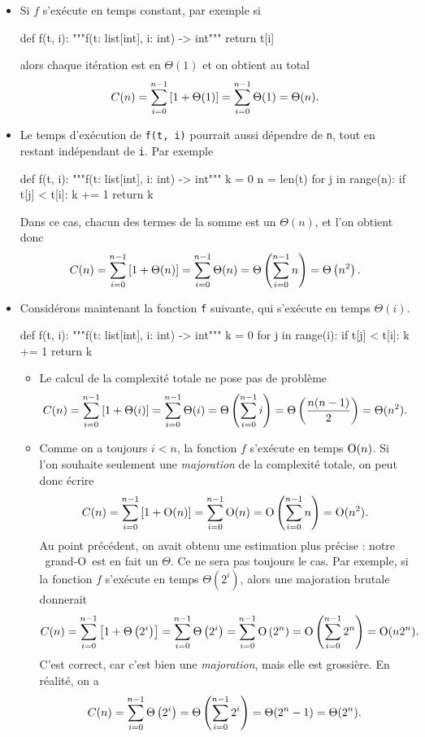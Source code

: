 \documentclass{magnolia}
\begin{document}
\begin{itemize}
  \item Si $f$ s'exécute en temps constant,
  par exemple si
\begin{pythoncodeline}
def f(t, i):
    """f(t: list[int], i: int) -> int"""
    return t[i]
\end{pythoncodeline}
  alors chaque itération est en
  $\Theta(1)$ et on obtient au total
  \[C(n)=\sum_{i=0}^{n-1} \left[1+\Theta(1)\right]=\sum_{i=0}^{n-1} \Theta(1)=\Theta(n).\]
  \item Le temps d'exécution de \verb!f(t, i)! pourrait aussi dépendre de \verb!n!,
  tout en restant indépendant de \verb!i!. Par exemple
\begin{pythoncodeline}
def f(t, i):
    """f(t: list[int], i: int) -> int"""
    k = 0
    n = len(t)
    for j in range(n):
        if t[j] < t[i]:
            k += 1
    return k
\end{pythoncodeline}
  Dans ce cas, chacun des termes de la somme  est un $\Theta(n)$,
  et l'on obtient donc
  \[C(n)=\sum_{i = 0}^{n - 1} \left[1 + \Theta(n)\right]
        =\sum_{i = 0}^{n - 1} \Theta(n)
        =\Theta\left(\sum_{i=0}^{n-1} n\right)=\Theta\left(n^2\right).\]
  \item Considérons maintenant la fonction \verb!f! suivante, qui s'exécute en
  temps $\Theta(i)$.
\begin{pythoncodeline}
def f(t, i):
    """f(t: list[int], i: int) -> int"""
    k = 0
    for j in range(i):
        if t[j] < t[i]:
            k += 1
    return k
\end{pythoncodeline}
  \begin{itemize}
    \item Le calcul de la complexité totale ne pose pas de problème
    \[
     C(n)=\sum_{i = 0}^{n - 1} \left[1+\Theta(i)\right]
         =\sum_{i = 0}^{n - 1} \Theta(i)
         =\Theta\left(\sum_{i = 0}^{n - 1} i\right)
         =\Theta\left(\frac{n(n - 1)}{2}\right)
         =\Theta(n^2).
    \]

    \item Comme on a toujours $i < n$, la fonction $f$ s'exécute en temps
    ${\rm O}(n)$. Si l'on souhaite seulement une \emph{majoration} de la
    complexité totale, on peut donc écrire
    \[
      C(n)=\sum_{i = 0}^{n - 1} \left[1+{\rm O}(n)\right]
      =\sum_{i = 0}^{n - 1} {\rm O}(n)
      ={\rm O}\left(\sum_{i = 0}^{n - 1} n\right)
      = {\rm O}(n^2).
    \]
    Au point précédent, on avait obtenu une estimation plus précise : notre \og~grand-O~\fg est en fait
    un $\Theta$.
Ce ne sera pas toujours le cas. Par exemple, si la fonction $f$
  s'exécute en temps $\Theta(2^i)$, alors une majoration brutale donnerait
  \[
    C(n)=\sum_{i = 0}^{n - 1} \left[1+\Theta\left(2^i\right)\right]
    =\sum_{i = 0}^{n - 1} \Theta\left(2^i\right)
    =\sum_{i = 0}^{n - 1} {\rm O}\left(2^n\right)
    ={\rm O}\left(\sum_{i = 0}^{n - 1} 2^n\right)
    = {\rm O}(n2^n).
  \]
  C'est correct, car c'est bien une \emph{majoration}, mais elle est grossière. En
  réalité, on a
  \[
    C(n)
    =\sum_{i = 0}^{n - 1} \Theta\left(2^i\right)
    =\Theta\left(\sum_{i=0}^{n-1} 2^i\right)
    =\Theta(2^n - 1)
    = \Theta(2^n).
  \]
\end{itemize}
\end{itemize}
\end{document}
